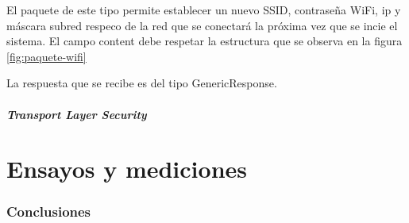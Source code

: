 El paquete de este tipo permite establecer un nuevo SSID, contraseña WiFi, ip y máscara subred respeco de la red que se conectará la próxima vez que se incie el sistema.
El campo content debe respetar la estructura que se observa en la figura \ref{fig:paquete-wifi}


La respuesta que se recibe es del tipo GenericResponse.


\subsubsection{Transport Layer Security}


\clearpage
\part{Ensayos y mediciones}\label{part:ensayos}
\section{Conclusiones}
